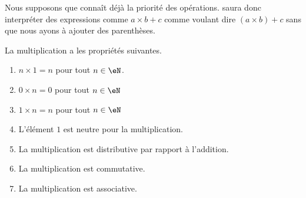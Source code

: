 \begin{normaltext}
    Nous supposons que  connaît déjà la priorité des opérations.  saura donc interpréter des expressions comme \( a\times b+c\) comme voulant dire \( (a\times b)+c\) sans que nous ayons à ajouter des parenthèses.
\end{normaltext}

\begin{proposition}     \label{PROPooGHDOooFYRmon}
    La multiplication a les propriétés suivantes.
    \begin{enumerate}
        \item       \label{ITEMooHFWRooDCEpjj}
            \( n\times 1=n\) pour tout \( n\in\eN\).
        \item       \label{ITEMooNBYKooXnGRrf}
            \( 0\times n=0\) pour tout \( n\in \eN\)
        \item       \label{ITEMooWUQAooOgDeAY}
            \( 1\times n=n\) pour tout \( n\in \eN\)
        \item      \label{ITEMooLJQBooVpUxUv}
            L'élément \( 1\) est neutre pour la multiplication.
        \item       \label{ITEMooDYLIooETIBEL}
            La multiplication est distributive par rapport à l'addition.
        \item       \label{ITEMooWJPOooRUYjwQ}
            La multiplication est commutative.
        \item       \label{ITEMooQBFSooWGDQYX}
            La multiplication est associative.
    \end{enumerate}
\end{proposition}

